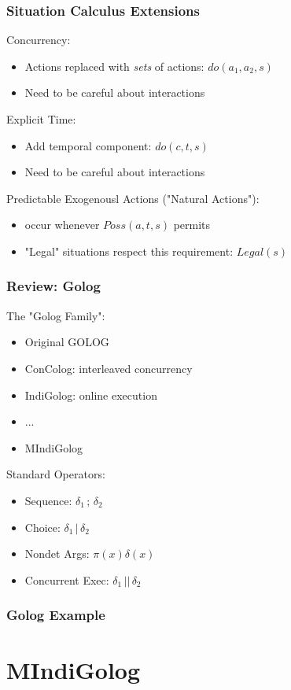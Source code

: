 \documentclass[compress]{beamer}
\begin{document}
\begin{frame}
\frametitle{Situation Calculus Extensions}
Concurrency:
\begin{itemize}
  \item Actions replaced with \emph{sets} of actions: $do({a_1,a_2},s)$
  \item Need to be careful about interactions
\end{itemize}
\pause
Explicit Time:
\begin{itemize}
  \item Add temporal component: $do(c,t,s)$
  \item Need to be careful about interactions
\end{itemize}
\pause
Predictable Exogenousl Actions ("Natural Actions"):
\begin{itemize}
  \item {} occur whenever $Poss(a,t,s)$ permits
  \item "Legal" situations respect this requirement: $Legal(s)$
\end{itemize}
\end{frame}

\begin{frame}
\frametitle{Review: Golog}
The "Golog Family":
\begin{itemize}
  \item Original GOLOG
  \item ConColog: interleaved concurrency
  \item IndiGolog: online execution
  \item ...
  \item MIndiGolog
\end{itemize}
Standard Operators:
\begin{itemize}
  \item Sequence:  $\delta_1\,;\,\delta_2$
  \item Choice: $\delta_1\,|\,\delta_2$
  \item Nondet Args: $\pi(x)\delta(x)$
  \item Concurrent Exec: $\delta_1\,||\,\delta_2$
\end{itemize}
\end{frame}

\begin{frame}
\frametitle{Golog Example}
\end{frame}

\section{MIndiGolog}
\end{document}

